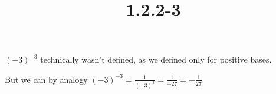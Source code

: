 \documentclass{article}
\title{1.2.2-3}
\begin{document}
\maketitle

$(-3)^{-3}$ technically wasn't defined, as we defined only for positive bases.

But we can by analogy $(-3)^{-3} = \frac{1}{(-3)^3} = \frac{1}{-27} = -\frac{1}{27}$
\end{document}
